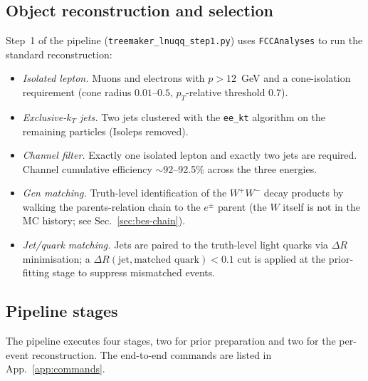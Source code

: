 \documentclass[11pt,a4paper]{article}
\newcommand{\WW}{\ensuremath{W^+W^-}\xspace}
\newcommand{\codename}[1]{\texttt{\small #1}}
\begin{document}
\subsection{Object reconstruction and selection}\label{sec:selection}

Step~1 of the pipeline (\codename{treemaker\_lnuqq\_step1.py}) uses
\codename{FCCAnalyses} to run the standard reconstruction:
\begin{itemize}[leftmargin=*]
  \item \emph{Isolated lepton.} Muons and electrons with $p > 12$~GeV
        and a cone-isolation requirement (cone radius $0.01$--$0.5$,
        $p_T$-relative threshold $0.7$).
  \item \emph{Exclusive-$k_T$ jets.} Two jets clustered with the
        \codename{ee\_kt} algorithm on the remaining particles
        (Isoleps removed).
  \item \emph{Channel filter.} Exactly one isolated lepton and exactly
        two jets are required. Channel cumulative efficiency $\sim
        92$--92.5\% across the three energies.
  \item \emph{Gen matching.} Truth-level identification of the \WW
        decay products by walking the parents-relation chain to the
        $e^\pm$ parent (the $W$ itself is not in the MC history; see
        Sec.~\ref{sec:bes-chain}).
  \item \emph{Jet/quark matching.} Jets are paired to the truth-level
        light quarks via $\Delta R$ minimisation; a
        $\Delta R(\text{jet},\text{matched quark}) < 0.1$ cut is applied
        at the prior-fitting stage to suppress mismatched events.
\end{itemize}

\subsection{Pipeline stages}

The pipeline executes four stages, two for prior preparation and two
for the per-event reconstruction. The end-to-end commands are listed
in App.~\ref{app:commands}.
\end{document}
